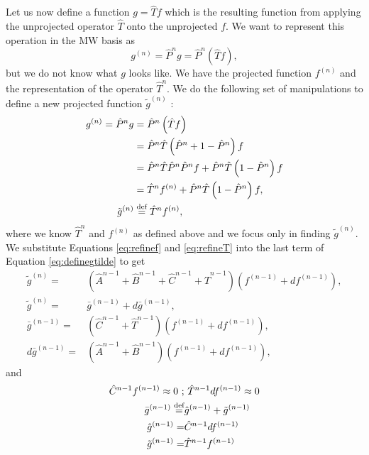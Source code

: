 \documentclass[../Thesis.tex]{subfiles}
\begin{document}
Let us now define a function $g = \hat{T}f$ which is the resulting function from applying the
unprojected operator $\hat{T}$ onto the unprojected $f$. We want to represent this
operation in the \ac{MW} basis as
\begin{equation}
  g^{(n)} = \hat{P}^ng =  \hat{P}^n\left(\hat{T}f\right),
\end{equation}
but we do not know what $g$ looks like. We have the projected function $f^{ (n)}$ and the
representation of the operator $\hat{T}^n$. We do the following set of manipulations to
define a new projected function $\tilde{g}^{(n)}$ \cite{Frediani:2013}:
\begin{align}
  \begin{split}\label{eq:definegtilde}
    g^{(n)} = \hat{P}^ng &=  \hat{P}^n\left(\hat{T}f\right)\\
     &= \hat{P}^n\hat{T}\left(\hat{P}^n + 1 - \hat{P}^n\right)f\\
     &= \hat{P}^n\hat{T}\hat{P}^n\hat{P}^nf + \hat{P}^n\hat{T}\left(1 - \hat{P}^n\right)f\\
     &=   \hat{T}^nf^{(n)} + \hat{P}^n\hat{T}\left(1 - \hat{P}^n\right)f,\\
    \tilde{g}^{(n)} &\stackrel{\text{def}}{=} \hat{T}^nf^{(n)},\\
  \end{split}
\end{align}
where we know $ \hat{T}^n$ and $f^{(n)}$ as defined above and we focus only in
finding $\tilde{g}^{(n)}$. We substitute Equations \ref{eq:refinef} and \ref{eq:refineT}
into the last term of Equation \ref{eq:definegtilde} to get
\begin{align}
  \tilde{g}^{(n)} =& \left(\hat{A}^{n-1} + \hat{B}^{n-1} + \hat{C}^{n-1} + \hat{T}^{n-1}\right)\left(f^{(n-1)} + df^{(n-1)}\right),\\
  \tilde{g}^{(n)} =&  \bar{g}^{(n-1)} + d\bar{g}^{(n-1)},\\
  \bar{g}^{(n-1)} =&\left(\hat{C}^{n-1} + \hat{T}^{n-1}\right)\left(f^{(n-1)} + df^{(n-1)}\right),\\
  d\bar{g}^{(n-1)} =& \left(\hat{A}^{n-1} + \hat{B}^{n-1}\right)\left(f^{(n-1)} + df^{(n-1)}\right),
\end{align}
and
\begin{align}
  \begin{split}
    \hat{C}^{n-1}f^{(n-1)} \approx 0 \ ;& \ \hat{T}^{n-1}df^{(n-1)}\approx 0\\
    \bar{g}^{(n-1)} \defeq& \hat{g}^{(n-1)} + \tilde{g}^{(n-1)}\\
    \hat{g}^{(n-1)} =& \hat{C}^{n-1}df^{(n-1)}\\
    \tilde{g}^{(n-1)} =& \hat{T}^{n-1}f^{(n-1)}
  \end{split}
\end{align}
\end{document}
